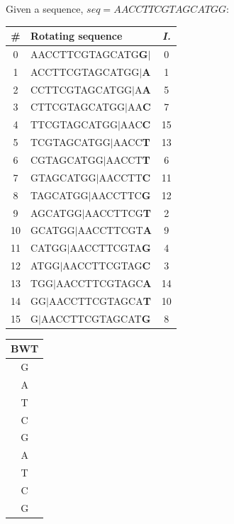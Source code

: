 \begin{table}[!ht]
  \scriptsize
  Given a sequence, $seq=AACCTTCGTAGCATGG$:
  \begin{center}
      \begin{tabular}{clc}
        \hline
        \textbf{\#} & \textbf{Rotating sequence} & \textbf{\textit{I.}} \\ \hline
        0  & AACCTTCGTAGCATG\textbf{G}$|$ & 0  \\
        1  & ACCTTCGTAGCATGG$|$\textbf{A} & 1  \\
        2  & CCTTCGTAGCATGG$|$A\textbf{A} & 5  \\
        3  & CTTCGTAGCATGG$|$AA\textbf{C} & 7  \\
        4  & TTCGTAGCATGG$|$AAC\textbf{C} & 15 \\
        5  & TCGTAGCATGG$|$AACC\textbf{T} & 13 \\
        6  & CGTAGCATGG$|$AACCT\textbf{T} & 6  \\
        7  & GTAGCATGG$|$AACCTT\textbf{C} & 11 \\
        8  & TAGCATGG$|$AACCTTC\textbf{G} & 12 \\
        9  & AGCATGG$|$AACCTTCG\textbf{T} & 2  \\
        10 & GCATGG$|$AACCTTCGT\textbf{A} & 9  \\
        11 & CATGG$|$AACCTTCGTA\textbf{G} & 4  \\
        12 & ATGG$|$AACCTTCGTAG\textbf{C} & 3  \\
        13 & TGG$|$AACCTTCGTAGC\textbf{A} & 14 \\
        14 & GG$|$AACCTTCGTAGCA\textbf{T} & 10 \\
        15 & G$|$AACCTTCGTAGCAT\textbf{G} & 8  \\ \hline
      \end{tabular}
    {\Large\pointer}
      \begin{tabular}{ c }
        \hline
        \textbf{BWT} \\ \hline
        G \\
        A \\
        T \\
        C \\
        G \\
        A \\
        T \\
        C \\
        G \\

\end{tabular}
\end{center}
\end{table}
